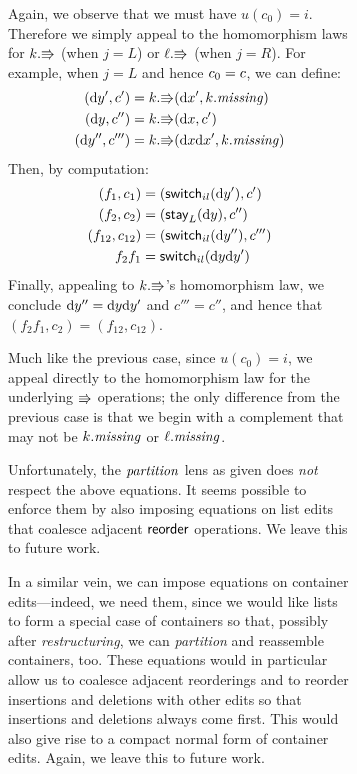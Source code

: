 \begin{figure}
\begin{figure}
\begin{pf}
\begin{trivlist}
 Again, we observe
            that we must have $u(c_0)=i$. Therefore we simply appeal to the
            homomorphism laws
            for $k.\mathord{\Rrightarrow}$ (when $j=L$) or $\ell.\mathord{\Rrightarrow}$ (when $j=R$). For
            example, when $j=L$ and hence $c_0= c$, we can define:
            \begin{align*}
                (\textrm{d} y',c') &= k.\mathord{\Rrightarrow}(\textrm{d} x',k.\mathit{missing}) \\
                (\textrm{d} y,c'') &= k.\mathord{\Rrightarrow}(\textrm{d} x,c') \\
                (\textrm{d} y'',c''') &= k.\mathord{\Rrightarrow}(\textrm{d} x\textrm{d} x',k.\mathit{missing})
            \end{align*}
            Then, by computation:
            \begin{align*}
                (f_1,c_1) &= (\mathsf{switch}_{il}(\textrm{d} y'),{c'}) \\
                (f_2,c_2) &= (\mathsf{stay}_L(\textrm{d} y),{c''}) \\
                (f_{12},c_{12}) &= (\mathsf{switch}_{il}(\textrm{d} y''),{c'''}) \\
                f_2f_1 &= \mathsf{switch}_{il}(\textrm{d} y\textrm{d} y')
            \end{align*}
            Finally, appealing to $k.\mathord{\Rrightarrow}$'s homomorphism law, we conclude
            $\textrm{d} y''=\textrm{d} y\textrm{d} y'$ and $c'''=c''$, and hence that
            $(f_2f_1,c_2)=(f_{12},c_{12})$.

 Much like the
            previous case, since $u(c_0)=i$, we appeal directly to the
            homomorphism law for the underlying $\mathord{\Rrightarrow}$ operations; the
            only difference from the previous case is that we begin with a
            complement that may not be $k.\mathit{missing}$ or $\ell.\mathit{missing}$.
    \endofpf
    \end{trivlist}
\end{pf}
\fi%

Unfortunately, the $\mathit{partition}$ lens as given does {\em not} respect the
above equations.  It seems possible to enforce them by also imposing
equations on list edits that coalesce adjacent $\mathsf{reorder}$ operations. We
leave this to future work.

In a similar vein, we can impose equations on container edits---indeed, we
need them, since we would like lists to form a
special case of containers so that, possibly after
\emph{restructuring}, we can \emph{partition} and reassemble
containers, too. These equations would in particular allow us to
coalesce adjacent reorderings and to reorder insertions and
deletions with other edits so that insertions and deletions
always come first. This would also give rise to a compact normal
form of container edits. Again, we leave this to future work. 


\end{figure}
\end{figure}
